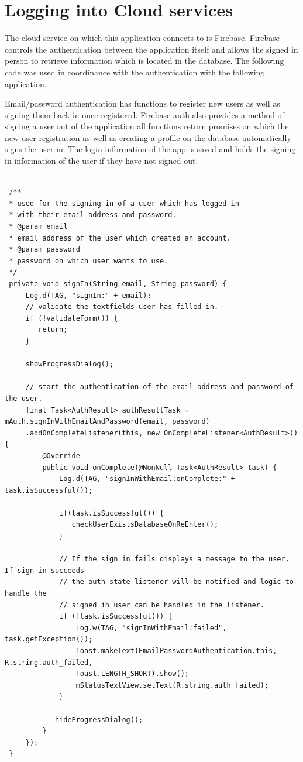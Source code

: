 \section{Logging into Cloud services}
The cloud service on which this application connects to is Firebase. Firebase controls the authentication between the application itself and allows the signed in person to retrieve information which is located in the database. The following code was used in coordinance with the authentication with the following application.
\par
Email/password authentication has functions to register new users as well as signing them back in once registered. Firebase auth also provides a method of signing a user out of the application all functions return promises on which the new user registration as well as creating a profile on the database automatically signs the user in. The login information of the app is saved and holds the signing in information of the user if they have not signed out.

\begin{lstlisting}[style=myCustomMatlabStyle, basicstyle=\small, breaklines, caption=Authentication Example,captionpos=b] 

 /**
 * used for the signing in of a user which has logged in
 * with their email address and password.
 * @param email
 * email address of the user which created an account.
 * @param password
 * password on which user wants to use.
 */
 private void signIn(String email, String password) {
     Log.d(TAG, "signIn:" + email);
     // validate the textfields user has filled in.
     if (!validateForm()) {
        return;
     }
 
     showProgressDialog();
 
     // start the authentication of the email address and password of the user.
     final Task<AuthResult> authResultTask = mAuth.signInWithEmailAndPassword(email, password)
     .addOnCompleteListener(this, new OnCompleteListener<AuthResult>() {
         @Override
         public void onComplete(@NonNull Task<AuthResult> task) {
             Log.d(TAG, "signInWithEmail:onComplete:" + task.isSuccessful());
         
             if(task.isSuccessful()) {
                checkUserExistsDatabaseOnReEnter();
             }
             
             // If the sign in fails displays a message to the user. If sign in succeeds
             // the auth state listener will be notified and logic to handle the
             // signed in user can be handled in the listener.
             if (!task.isSuccessful()) {
                 Log.w(TAG, "signInWithEmail:failed", task.getException());
                 Toast.makeText(EmailPasswordAuthentication.this, R.string.auth_failed,
                 Toast.LENGTH_SHORT).show();
                 mStatusTextView.setText(R.string.auth_failed);
             }
         
            hideProgressDialog();
         }
     });
 }
\end{lstlisting}


